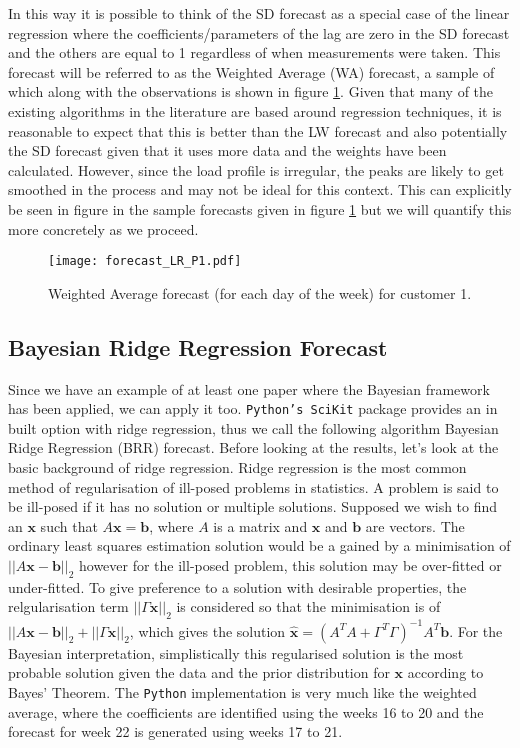 In this way it is possible to think of the SD forecast as a special case of the linear regression where the coefficients/parameters of the lag are zero in the SD forecast and the others are equal to 1 regardless of when measurements were taken. This forecast will be referred to as the Weighted Average (WA) forecast, a sample of which along with the observations is shown in figure \ref{fig:LR_forecast_P1}. Given that many of the existing algorithms in the literature are based around regression techniques, it is reasonable to expect that this is better than the LW forecast and also potentially the SD forecast given that it uses more data and the weights have been calculated. However, since the load profile is irregular, the peaks are likely to get smoothed in the process and may not be ideal for this context. This can explicitly be seen in figure in the sample forecasts given in figure \ref{fig:LR_forecast_P1} but we will quantify this more concretely as we proceed. %
\begin{figure}
\centering
\texttt{[image: forecast\_LR\_P1.pdf]}
\caption{Weighted Average forecast (for each day of the week) for customer 1.}
\label{fig:LR_forecast_P1} 
\end{figure}

\subsection{Bayesian Ridge Regression Forecast} %

Since we have an example of at least one paper \citep{douglas98} where the Bayesian framework has been applied, we can apply it too. \texttt{Python's SciKit} package provides an in built option with ridge regression, thus we call the following algorithm Bayesian Ridge Regression (BRR) forecast. Before looking at the results, let's look at the basic background of ridge regression. Ridge regression is the most common method of regularisation of ill-posed problems in statistics. A problem is said to be ill-posed if it has no solution or multiple solutions. Supposed we wish to find an $\boldsymbol{x}$ such that $A\boldsymbol{x}=\boldsymbol{b}$, where $A$ is a matrix and $\boldsymbol{x}$ and $\boldsymbol{b}$ are vectors. The ordinary least squares estimation solution would be a gained by a minimisation of $||A\boldsymbol{x} - \boldsymbol{b}||_2$ however for the ill-posed problem, this solution may be over-fitted or under-fitted. To give preference to a solution with desirable properties, the relgularisation term $||\Gamma\boldsymbol{x}||_2$ is considered so that the minimisation is of $||A\boldsymbol{x} - \boldsymbol{b}||_2 + ||\Gamma\boldsymbol{x}||_2$, which gives the solution $\hat{\boldsymbol{x}} = \left(A^T A + \Gamma^T \Gamma \right)^{-1} A^T \boldsymbol{b}$. For the Bayesian interpretation, simplistically this regularised solution is the most probable solution given the data and the prior distribution for $\boldsymbol{x}$ according to Bayes' Theorem. The \texttt{Python} implementation is very much like the weighted average, where the coefficients are identified using the weeks 16 to 20 and the forecast for week 22 is generated using weeks 17 to 21.

